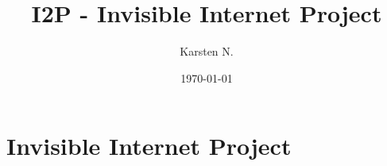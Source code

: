 \documentclass[notitlepage,a4paper,10pt]{article}
\title{I2P - Invisible Internet Project}
\author{Karsten N.}
\date{\today}
\begin{document}
\maketitle
\begin{abstract}

\end{abstract}
\newpage
\section{Invisible Internet Project}



\end{document}
